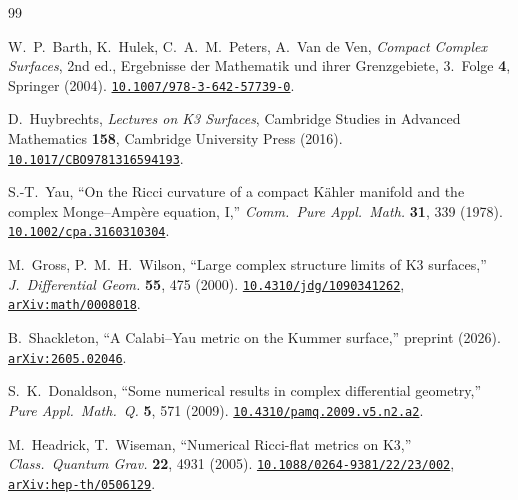 
\begin{thebibliography}{99}

 W.~P.~Barth, K.~Hulek, C.~A.~M.~Peters, A.~Van de Ven, \textit{Compact Complex Surfaces}, 2nd ed., Ergebnisse der Mathematik und ihrer Grenzgebiete, 3.~Folge \textbf{4}, Springer (2004). \href{https://doi.org/10.1007/978-3-642-57739-0}{\texttt{10.1007/978-3-642-57739-0}}.

 D.~Huybrechts, \textit{Lectures on K3 Surfaces}, Cambridge Studies in Advanced Mathematics \textbf{158}, Cambridge University Press (2016). \href{https://doi.org/10.1017/CBO9781316594193}{\texttt{10.1017/CBO9781316594193}}.

 S.-T.~Yau, ``On the Ricci curvature of a compact K\"ahler manifold and the complex Monge--Amp\`ere equation, I,'' \textit{Comm.\ Pure Appl.\ Math.} \textbf{31}, 339 (1978). \href{https://doi.org/10.1002/cpa.3160310304}{\texttt{10.1002/cpa.3160310304}}.

 M.~Gross, P.~M.~H.~Wilson, ``Large complex structure limits of K3 surfaces,'' \textit{J.\ Differential Geom.} \textbf{55}, 475 (2000). \href{https://doi.org/10.4310/jdg/1090341262}{\texttt{10.4310/jdg/1090341262}}, \href{https://arxiv.org/abs/math/0008018}{\texttt{arXiv:math/0008018}}.

 B.~Shackleton, ``A Calabi--Yau metric on the Kummer surface,'' preprint (2026). \href{https://arxiv.org/abs/2605.02046}{\texttt{arXiv:2605.02046}}.

 S.~K.~Donaldson, ``Some numerical results in complex differential geometry,'' \textit{Pure Appl.\ Math.\ Q.} \textbf{5}, 571 (2009). \href{https://doi.org/10.4310/pamq.2009.v5.n2.a2}{\texttt{10.4310/pamq.2009.v5.n2.a2}}.

 M.~Headrick, T.~Wiseman, ``Numerical Ricci-flat metrics on K3,'' \textit{Class.\ Quantum Grav.} \textbf{22}, 4931 (2005). \href{https://doi.org/10.1088/0264-9381/22/23/002}{\texttt{10.1088/0264-9381/22/23/002}}, \href{https://arxiv.org/abs/hep-th/0506129}{\texttt{arXiv:hep-th/0506129}}.


\end{thebibliography}
